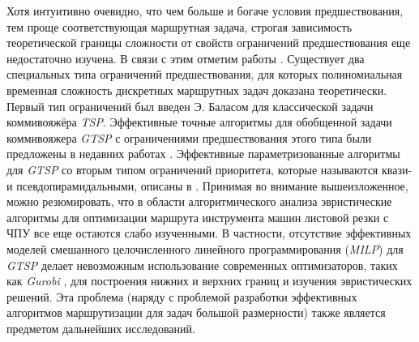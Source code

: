 Хотя интуитивно очевидно,
что чем больше и богаче условия предшествования,
тем проще соответствующая маршрутная задача,
строгая зависимость теоретической границы сложности
от свойств ограничений предшествования еще недостаточно изучена.
В связи с этим отметим работы \cite{bib:x200,bib:x201}.
Существует два специальных типа ограничений предшествования,
для которых полиномиальная временная сложность
дискретных маршрутных задач доказана теоретически.
Первый тип ограничений был введен Э. Баласом \cite{bib:x202}
для классической задачи коммивояжёра {\it TSP}.
Эффективные точные алгоритмы для обобщенной задачи коммивояжера {\it GTSP}
с ограничениями предшествования этого типа
были предложены в недавних работах \cite{bib:x203,bib:x204}.
Эффективные параметризованные алгоритмы для {\it GTSP}
со вторым типом ограничений приоритета,
которые называются квази- и псевдопирамидальными,
описаны в \cite{bib:x205,bib:x206}.
Принимая во внимание вышеизложенное,
можно резюмировать,
что в области алгоритмического анализа
эвристические алгоритмы для оптимизации
маршрута инструмента машин листовой резки с ЧПУ
все еще остаются слабо изученными.
В частности, отсутствие эффективных моделей смешанного целочисленного линейного программирования
({\it MILP}) для {\it GTSP}
делает невозможным использование современных оптимизаторов,
таких как {\it Gurobi} \cite{bib:x207},
для построения нижних и верхних границ и изучения эвристических решений.
Эта проблема
(наряду с проблемой разработки эффективных алгоритмов маршрутизации для задач большой размерности)
также является предметом дальнейших исследований.
